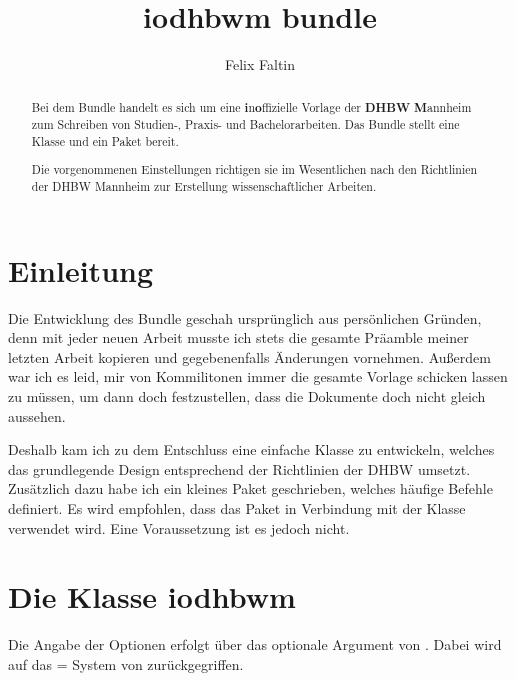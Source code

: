 \documentclass[babel=ngerman,highlight=false]{skdoc}
\title{iodhbwm bundle}
\author{Felix Faltin}
\begin{document}
    
   
    \maketitle

    \begin{abstract}
        Bei dem Bundle  handelt es sich um eine \textbf{i}n\textbf{o}ffizielle Vorlage der \textbf{DHBW} \textbf{M}annheim zum Schreiben von Studien-, Praxis- und Bachelorarbeiten. Das Bundle stellt eine Klasse  und ein Paket  bereit.

        Die vorgenommenen Einstellungen richtigen sie im Wesentlichen nach den Richtlinien der DHBW Mannheim zur Erstellung wissenschaftlicher Arbeiten.
    \end{abstract}


    \tableofcontents

    \section{Einleitung}
        Die Entwicklung des Bundle geschah ursprünglich aus persönlichen Gründen, denn mit jeder neuen Arbeit musste ich stets die gesamte Präamble meiner letzten Arbeit kopieren und gegebenenfalls Änderungen vornehmen. Außerdem war ich es leid, mir von Kommilitonen immer die gesamte Vorlage schicken lassen zu müssen, um dann doch festzustellen, dass die Dokumente doch nicht gleich aussehen.

        Deshalb kam ich zu dem Entschluss eine einfache Klasse zu entwickeln, welches das grundlegende Design entsprechend der Richtlinien der DHBW umsetzt. Zusätzlich dazu habe ich ein kleines Paket geschrieben, welches häufige Befehle definiert. Es wird empfohlen, dass das Paket in Verbindung mit der Klasse verwendet wird. Eine Voraussetzung ist es jedoch nicht.

    \section{Die Klasse iodhbwm}\label{cls:iodhbwm}
        Die Angabe der Optionen erfolgt über das optionale Argument von .
        Dabei wird auf das = System von  zurückgegriffen.
\end{document}
